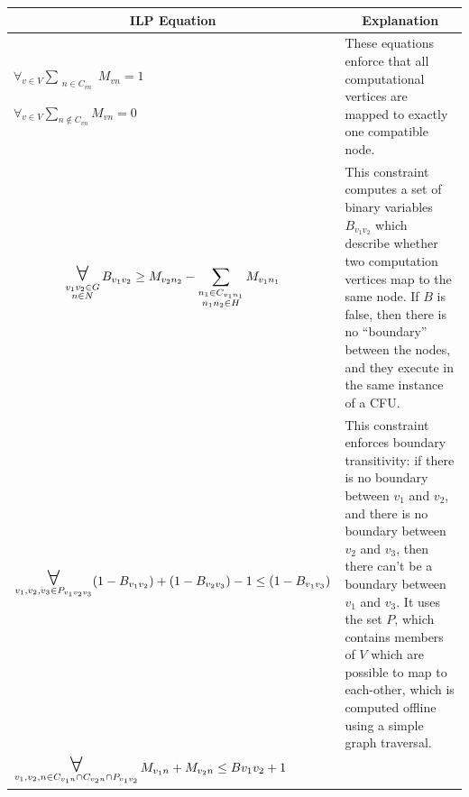 \begin{table}[h]
\begin{center}
\setlength{\tabcolsep}{.18em}
\def\arraystretch{1.3}
\small 
\begin{tabular}{m{0.5\linewidth}m{0.5\linewidth}}

\multicolumn{1}{c}{\textbf{ILP Equation}} & \multicolumn{1}{c}{\textbf{Explanation}} \\
\toprule

\centering
$\forall_{v\in V} \sum_{\substack{n \in C_{vn}}} M_{vn} = 1 $

$\forall_{v\in V} \sum_{n \notin C_{vn}} M_{vn} = 0$
& These equations enforce that all computational vertices are mapped to exactly
one compatible node.
\\ \midrule

\centering
\begin{eqnarray*}
\Forall_{\substack{ \\v_1v_2 \in G \\ n \in N}}
  B_{v_{1}v_2} \ge  M_{v_{2}n_2} - \sum_{\substack{n_1 \in C_{v_{1}n_1}\\ n_1n_2 \in H}} M_{v_{1}n_{1}}  
\end{eqnarray*}

& This constraint computes a set of binary variables $B_{v_{1}v_2}$ which describe 
whether two computation vertices map to the same node.  If $B$ is false, then
there is no ``boundary'' between the nodes, and they execute in the same instance 
of a CFU. 
\\ \midrule

\centering
\begin{eqnarray*}
\Forall_{v_1,v_2,v_3 \in P_{v_{1}v_{2}v_{3}} } 
  (1-B_{v_{1}v_{2}}) + (1-B_{v_{2}v_3}) -1 \le (1-B_{v_{1}v_3}) 
\end{eqnarray*}

& This constraint enforces boundary transitivity: if there is no boundary between
$v_1$ and $v_2$, and there is no boundary between $v_2$ and $v_3$, then there
can't be a boundary between $v_1$ and $v_3$.  It uses the set $P$, which
contains members of $V$ which are possible to map to each-other, which is
computed offline using a simple graph traversal.  
\\ \midrule

\centering
$\Forall_{v_1,v_2,n \in C_{v_{1}n} \cap C_{v_{2}n} \cap P_{v_{1}v_{2}} }
M_{v_{1}n} + M_{v_{2}n} \le B{v_{1}v_{2}} +1$


\end{tabular}
\end{center}
\end{table}

